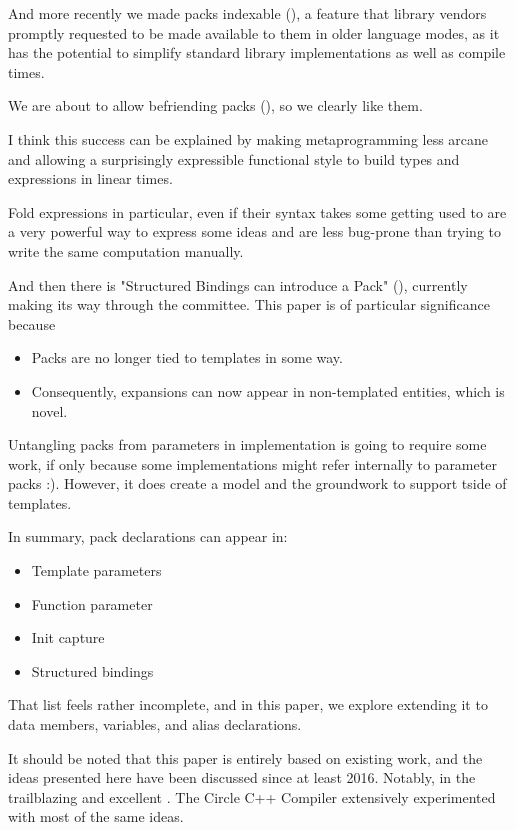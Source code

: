 \documentclass{wg21}
\begin{document}
And more recently we made packs indexable (), a feature that library vendors promptly requested to be made available to them
in older language modes, as it has the potential to simplify standard library implementations as well as compile times.

We are about to allow befriending packs (), so we clearly like them.

I think this success can be explained by making metaprogramming less arcane and allowing a surprisingly expressible functional style to build
types and expressions in linear times.

Fold expressions in particular, even if their syntax takes some getting used to are a very powerful way to express some ideas and are less bug-prone than trying to write the same computation manually.

And then there is "Structured Bindings can introduce a Pack" (), currently making its way through the committee.
This paper is of particular significance because
\begin{itemize}
    \item Packs are no longer tied to templates in some way.
    \item Consequently, expansions can now appear in non-templated entities, which is novel.
\end{itemize}

Untangling packs from parameters in implementation is going to require some work, if only because some implementations might refer internally to parameter packs :).
However, it does create a model and the groundwork to support tside of templates.

In summary, pack declarations can appear in:
\begin{itemize}
  \item Template parameters
  \item Function parameter
  \item Init capture
  \item Structured bindings
\end{itemize}

That list feels rather incomplete, and in this paper, we explore extending it to data members, variables, and alias declarations.

It should be noted that this paper is entirely based on existing work, and the ideas presented here have been discussed since at least 2016.
Notably, in the trailblazing  and excellent .
The Circle C++ Compiler extensively experimented with most of the same ideas.
\end{document}
